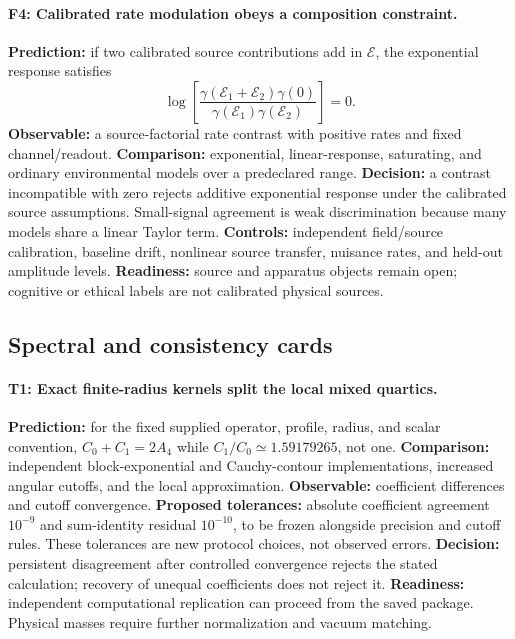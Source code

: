 \paragraph{F4: Calibrated rate modulation obeys a composition constraint.}
\textbf{Prediction:} if two calibrated source contributions add in $\mathcal E$, the exponential response satisfies
\begin{equation}
 \log\!\left[\frac{\gamma(\mathcal E_1+\mathcal E_2)\gamma(0)}
 {\gamma(\mathcal E_1)\gamma(\mathcal E_2)}\right]=0.
\end{equation}
\textbf{Observable:} a source-factorial rate contrast with positive rates and fixed channel/readout. \textbf{Comparison:} exponential, linear-response, saturating, and ordinary environmental models over a predeclared range. \textbf{Decision:} a contrast incompatible with zero rejects additive exponential response under the calibrated source assumptions. Small-signal agreement is weak discrimination because many models share a linear Taylor term. \textbf{Controls:} independent field/source calibration, baseline drift, nonlinear source transfer, nuisance rates, and held-out amplitude levels. \textbf{Readiness:} source and apparatus objects remain open; cognitive or ethical labels are not calibrated physical sources.

\subsection{Spectral and consistency cards}
\paragraph{T1: Exact finite-radius kernels split the local mixed quartics.}
\textbf{Prediction:} for the fixed supplied operator, profile, radius, and scalar convention, $C_0+C_1=2A_4$ while $C_1/C_0\simeq1.59179265$, not one. \textbf{Comparison:} independent block-exponential and Cauchy-contour implementations, increased angular cutoffs, and the local approximation. \textbf{Observable:} coefficient differences and cutoff convergence. \textbf{Proposed tolerances:} absolute coefficient agreement $10^{-9}$ and sum-identity residual $10^{-10}$, to be frozen alongside precision and cutoff rules. These tolerances are new protocol choices, not observed errors. \textbf{Decision:} persistent disagreement after controlled convergence rejects the stated calculation; recovery of unequal coefficients does not reject it. \textbf{Readiness:} independent computational replication can proceed from the saved package. Physical masses require further normalization and vacuum matching.

